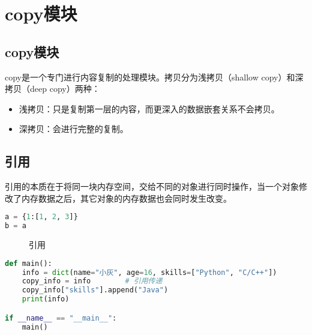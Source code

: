 \newpage

\section{copy模块}

\subsection{copy模块}

copy是一个专门进行内容复制的处理模块。拷贝分为浅拷贝（shallow copy）和深拷贝（deep copy）两种：

\begin{itemize}
	\item 浅拷贝：只是复制第一层的内容，而更深入的数据嵌套关系不会拷贝。
	\item 深拷贝：会进行完整的复制。
\end{itemize}

\vspace{0.5cm}

\subsection{引用}

引用的本质在于将同一块内存空间，交给不同的对象进行同时操作，当一个对象修改了内存数据之后，其它对象的内存数据也会同时发生改变。

\vspace{-0.5cm}

\begin{lstlisting}[language=Python]
a = {1:[1, 2, 3]}
b = a
\end{lstlisting}

\begin{figure}[H]
	\centering
	\caption{引用}
\end{figure}

\vspace{0.5cm}


\begin{lstlisting}[language=Python]
def main():
    info = dict(name="小灰", age=16, skills=["Python", "C/C++"])
    copy_info = info        # 引用传递
    copy_info["skills"].append("Java")
    print(info)

if __name__ == "__main__":
    main()
\end{lstlisting}

